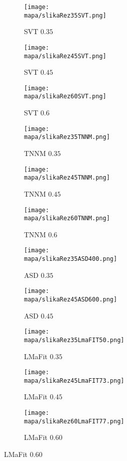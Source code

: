 \begin{figure}[!ht]
    \centering
    \begin{subfigure}{0.325\linewidth}
        \texttt{[image: \\mapa/slikaRez35SVT.png]}
        \caption{SVT $0.35$}
    \end{subfigure}
    \hfill
    \begin{subfigure}{0.325\linewidth}
        \texttt{[image: \\mapa/slikaRez45SVT.png]}
        \caption{SVT $0.45$}
    \end{subfigure}
    \hfill
    \begin{subfigure}{0.325\linewidth}
        \texttt{[image: \\mapa/slikaRez60SVT.png]}
        \caption{SVT $0.6$}
    \end{subfigure}
    \begin{subfigure}{0.325\linewidth}
        \texttt{[image: \\mapa/slikaRez35TNNM.png]}
        \caption{TNNM $0.35$}
    \end{subfigure}
    \hfill
    \begin{subfigure}{0.325\linewidth}
        \texttt{[image: \\mapa/slikaRez45TNNM.png]}
        \caption{TNNM $0.45$}
    \end{subfigure}
    \hfill
    \begin{subfigure}{0.325\linewidth}
        \texttt{[image: \\mapa/slikaRez60TNNM.png]}
        \caption{TNNM $0.6$}
    \end{subfigure}
    \begin{subfigure}{0.325\linewidth}
        \texttt{[image: \\mapa/slikaRez35ASD400.png]}
        \caption{ASD $0.35$}
    \end{subfigure}
    \hfill
    \begin{subfigure}{0.325\linewidth}
        \texttt{[image: \\mapa/slikaRez45ASD600.png]}
        \caption{ASD $0.45$}
    \end{subfigure}
    \begin{subfigure}{0.325\linewidth}
        \hfill
    \end{subfigure}
    \begin{subfigure}{0.325\linewidth}
        \texttt{[image: \\mapa/slikaRez35LmaFIT50.png]}
        \caption{LMaFit $0.35$}
    \end{subfigure}
    \hfill
    \begin{subfigure}{0.325\linewidth}
        \texttt{[image: \\mapa/slikaRez45LmaFIT73.png]}
        \caption{LMaFit $0.45$}
    \end{subfigure}
    \begin{subfigure}{0.325\linewidth}
        \texttt{[image: \\mapa/slikaRez60LmaFIT77.png]}
        \caption{LMaFit $0.60$}
    \end{subfigure}
\end{figure}